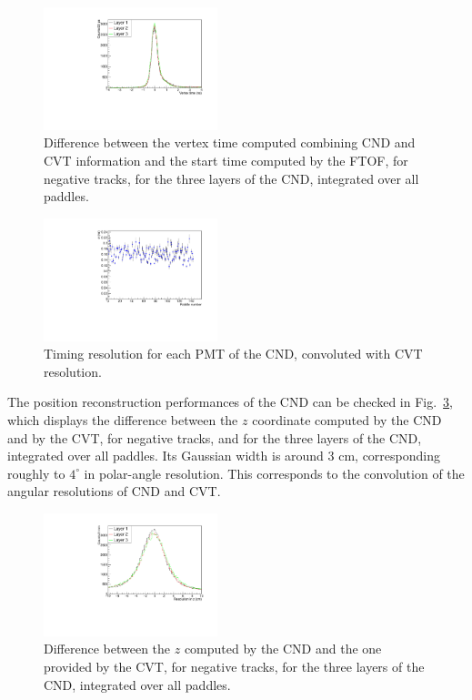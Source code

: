 \begin{figure}[htb]  
\begin{center}
\includegraphics[width=0.45\textwidth]{Figure/canVTPlot.pdf}
\caption {Difference between the vertex time computed combining CND and CVT information and the start time computed by the FTOF, for negative tracks, for the three layers of the CND, integrated over all paddles. }
\label{fig_performance_deltat_layers}
\end{center}
\end{figure}

\begin{figure}[htb]  
\begin{center}
\includegraphics[width=0.45\textwidth]{Figure/VTsigma.pdf}
\caption {Timing resolution for each PMT of the CND, convoluted with CVT resolution.}
\label{fig_performance_vt_sigma_allpaddles}
\end{center}
\end{figure}

The position reconstruction performances of the CND can be checked in Fig.~\ref{fig_performance_deltaz}, which displays the difference between the $z$ coordinate computed by the CND and by the CVT, for negative tracks, and for the three layers of the CND, integrated over all paddles. Its Gaussian width is around 3 cm, corresponding roughly to $4^{\circ}$ in polar-angle resolution. This corresponds to the convolution of the angular resolutions of CND and CVT. 

\begin{figure}[htb]  
\begin{center}
\includegraphics[width=0.45\textwidth]{Figure/canZ.pdf}
\caption {Difference between the $z$ computed by the CND and the one provided by the CVT, for negative tracks, for the three layers of the CND, integrated over all paddles. }
\label{fig_performance_deltaz}
\end{center}
\end{figure}

